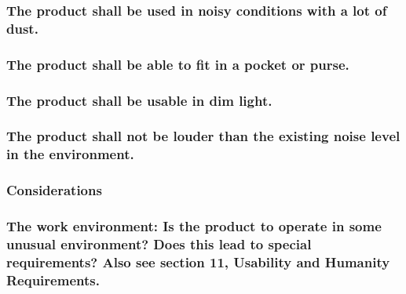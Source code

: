 \documentclass[
]{article}
\begin{document}
\hypertarget{the-product-shall-be-used-in-noisy-conditions-with-a-lot-of-dust.}{%
\subsubsection{The product shall be used in noisy conditions with a lot
of
dust.}\label{the-product-shall-be-used-in-noisy-conditions-with-a-lot-of-dust.}}

\hypertarget{the-product-shall-be-able-to-fit-in-a-pocket-or-purse.}{%
\subsubsection{The product shall be able to fit in a pocket or
purse.}\label{the-product-shall-be-able-to-fit-in-a-pocket-or-purse.}}

\hypertarget{the-product-shall-be-usable-in-dim-light.}{%
\subsubsection{The product shall be usable in dim
light.}\label{the-product-shall-be-usable-in-dim-light.}}

\hypertarget{the-product-shall-not-be-louder-than-the-existing-noise-level-in-the-environment.}{%
\subsubsection{The product shall not be louder than the existing noise
level in the
environment.}\label{the-product-shall-not-be-louder-than-the-existing-noise-level-in-the-environment.}}

\hypertarget{considerations-30}{%
\subsubsection{Considerations}\label{considerations-30}}

\hypertarget{the-work-environment-is-the-product-to-operate-in-some-unusual-environment-does-this-lead-to-special-requirements-also-see-section-11-usability-and-humanity-requirements.}{%
\subsubsection{The work environment: Is the product to operate in some
unusual environment? Does this lead to special requirements? Also see
section 11, Usability and Humanity
Requirements.}\label{the-work-environment-is-the-product-to-operate-in-some-unusual-environment-does-this-lead-to-special-requirements-also-see-section-11-usability-and-humanity-requirements.}}
\end{document}
